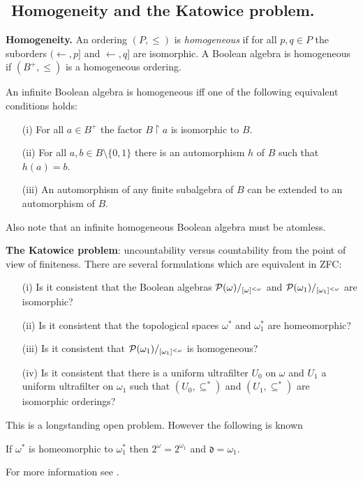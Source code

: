\subsection{${}$ \hspace{-1em}Homogeneity and the Katowice problem.}

\begin{definition}{\bf Homogeneity.} An ordering $(P,\leq)$ is \emph{homogeneous} if for all $p,q\in P$ the suborders
 $(\leftarrow,p]$ and $\leftarrow,q]$ are isomorphic. A Boolean algebra is homogeneous if $(B^+,\leq)$ is a homogeneous
 ordering.
\end{definition}

\begin{fact} An infinite Boolean algebra is homogeneous iff one of the following equivalent conditions holds:
\begin{itemize}
 \item[(i)] For all $a\in B^+$ the factor $B\upharpoonright a$ is isomorphic to $B$.
 \item[(ii)] For all $a,b\in B\setminus\{0,1\}$ there is an automorphism $h$ of $B$ such that $h(a)=b$.
 \item[(iii)] An automorphism of any finite subalgebra of $B$ can be extended to an automorphism of $B$.
\end{itemize}
Also note that an infinite homogeneous Boolean algebra must be atomless.
\end{fact}

{\bf The Katowice problem}: uncountability versus countability from the point of view of finiteness.
There are several formulations which are equivalent in ZFC:

\begin{itemize}
 \item[(i)] Is it consistent that the Boolean algebras ${{\mathcal P}}(\omega)/_{[\omega]^{<\omega}}$ and ${{\mathcal P}}(\omega_1)/_{[\omega_1]^{<\omega}}$
            are isomorphic?
 \item[(ii)] Is it consistent that the topological spaces $\omega^*$ and $\omega_1^*$ are homeomorphic?
 \item[(iii)] Is it consistent that ${{\mathcal P}}(\omega_1)/_{[\omega_1]^{<\omega}}$ is homogeneous?
 \item[(iv)] Is it consistent that there is a uniform ultrafilter $U_0$ on $\omega$ and $U_1$ a uniform ultrafilter on $\omega_1$ such that
              $(U_0,\subseteq^*)$ and $(U_1,\subseteq^*)$ are isomorphic orderings?
\end{itemize}

This is a longstanding open problem. However the following is known

\begin{fact}
 If $\omega^*$ is homeomorphic to $\omega_1^*$ then $2^\omega= 2^{\omega_1}$ and $\mathfrak{d}=\omega_1$.
\end{fact}

For more information see \cite{katowice}.






